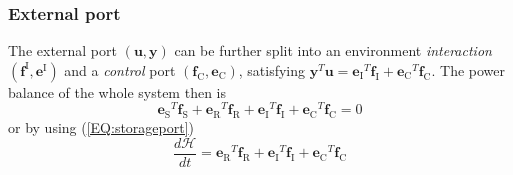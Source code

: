 \documentclass[a4paper,twoside, openright,12pt]{report}
\newcommand{\f}[1]{\boldsymbol{#1}}
\newcommand{\g}[1]{\text{#1}}
\begin{document}
{\subsubsection{External port}
The external port $(\f{u},\f{y})$ can be further split into an environment \emph{interaction} $(\f{f}^\text{I},\f{e}^\text{I})$ and a \emph{control} port $(\f{f}_\g{C},\f{e}_\g{C})$, satisfying $\f{y}^T \f{u} = {\f{e}_\g{I}}^T \f{f}_\g{I} + {\f{e}_\g{C}}^T \f{f}_\g{C}$.
The power balance of the whole system then is
\begin{equation}
{\f{e}_\g{S}}^T \f{f}_\g{S} + {\f{e}_\g{R}}^T \f{f}_\g{R} +{\f{e}_\g{I}}^T \f{f}_\g{I} + {\f{e}_\g{C}}^T \f{f}_\g{C} = 0
\end{equation} 
or by using (\ref{EQ:storageport})
\begin{equation}\label{EQ:energybalance}
\frac{d\mathcal{H}}{dt} = {\f{e}_\g{R}}^T \f{f}_\g{R} + {\f{e}_\g{I}}^T\f{f}_\g{I} + {\f{e}_\g{C}}^T \f{f}_\g{C} 
\end{equation}

}
\end{document}
